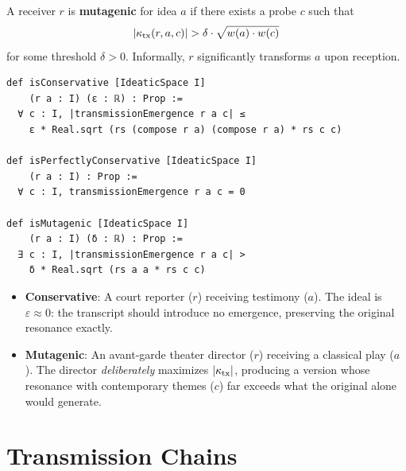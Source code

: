 \begin{definition}
A receiver $r$ is \textbf{mutagenic} for idea $a$ if there exists a
probe $c$ such that
\[
    |\kappa_{\mathrm{tx}}(r, a, c)| > \delta \cdot \sqrt{w(a) \cdot w(c)}
\]
for some threshold $\delta > 0$. Informally, $r$ significantly transforms
$a$ upon reception.
\end{definition}

\begin{lstlisting}[language=Lean4, caption={Conservative and mutagenic
receivers in Lean 4}]
def isConservative [IdeaticSpace I]
    (r a : I) (ε : ℝ) : Prop :=
  ∀ c : I, |transmissionEmergence r a c| ≤
    ε * Real.sqrt (rs (compose r a) (compose r a) * rs c c)

def isPerfectlyConservative [IdeaticSpace I]
    (r a : I) : Prop :=
  ∀ c : I, transmissionEmergence r a c = 0

def isMutagenic [IdeaticSpace I]
    (r a : I) (δ : ℝ) : Prop :=
  ∃ c : I, |transmissionEmergence r a c| >
    δ * Real.sqrt (rs a a * rs c c)
\end{lstlisting}

\begin{example}
\begin{itemize}
    \item \textbf{Conservative}: A court reporter ($r$) receiving
    testimony ($a$). The ideal is $\varepsilon \approx 0$: the
    transcript should introduce no emergence, preserving the original
    resonance exactly.

    \item \textbf{Mutagenic}: An avant-garde theater director ($r$)
    receiving a classical play ($a$). The director \emph{deliberately}
    maximizes $|\kappa_{\mathrm{tx}}|$, producing a version whose
    resonance with contemporary themes ($c$) far exceeds what the
    original alone would generate.
\end{itemize}
\end{example}

\section{Transmission Chains}

